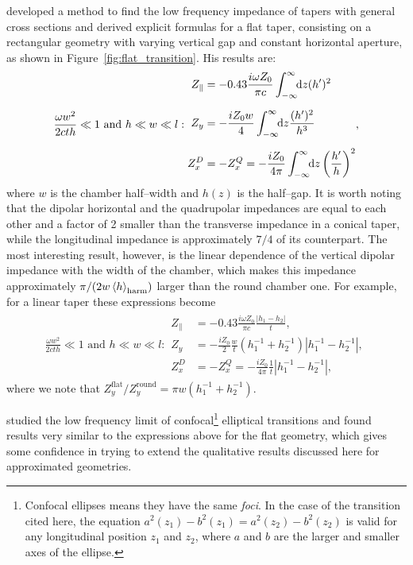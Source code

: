      developed a method to find the low frequency impedance of tapers with general cross sections and derived explicit formulas for a flat taper, consisting on a rectangular geometry with varying vertical gap and constant horizontal aperture, as shown in Figure~\ref{fig:flat_transition}. His results are:
    \begin{subequations}\label{eq:flat_transitions}
        \begin{align}
            \frac{\omega w^2}{2cth}\ll1\,\,\text{and}\,\,h\ll w\ll l:
            \begin{aligned}
                Z_\parallel &= -0.43\frac{i \omega Z_0}{\pi c}\infint{z}{(h')^2}\\[2mm]
                Z_y &= -\frac{i Z_0w}{4}\infint{z}{\frac{(h')^2}{h^3}}\\[2mm]
                Z_x^D&= -Z_x^Q= -\frac{i Z_0}{4\pi}\infint{z}{\fof{\frac{h'}{h}}^2}
            \end{aligned},
        \end{align}
    \end{subequations}
    where $w$ is the chamber half--width and $h(z)$ is the half--gap. It is worth noting that the dipolar horizontal and the quadrupolar impedances are equal to each other and a factor of 2 smaller than the transverse impedance in a conical taper, while the longitudinal impedance is approximately $7/4$ of its counterpart. The most interesting result, however, is the linear dependence of the vertical dipolar impedance with the width of the chamber, which makes this impedance approximately $\pi/(2w\average[\text{harm}]{h})$ larger than the round chamber one. For example, for a linear taper these expressions become
    \begin{align}
        \frac{\omega w^2}{2cth}\ll1\,\,\text{and}\,\,h\ll w\ll l:
        \begin{aligned}
        Z_\parallel &= -0.43\frac{i \omega Z_0}{\pi c}\frac{|h_1-h_2|}{t},\\[2mm]
        Z_y &= -\frac{i Z_0}{2}\frac{w}{t}(h_1^{-1}+h_2^{-1})|h_1^{-1}-h_2^{-1}|,\\[2mm]
        Z_x^D&= -Z_x^Q= -\frac{i Z_0}{4\pi}\frac1t|h_1^{-1}-h_2^{-1}|,
        \end{aligned}
    \end{align}
    where we note that $Z_y^\text{flat}/Z_y^\text{round} = \pi w(h_1^{-1}+h_2^{-1})$.

     studied the low frequency limit of confocal\footnote{Confocal ellipses means they have the same \emph{foci}. In the case of the transition cited here, the equation $a^2(z_1)-b^2(z_1)=a^2(z_2)-b^2(z_2)$ is valid for any longitudinal position $z_1$ and $z_2$, where $a$ and $b$ are the larger and smaller axes of the ellipse.} elliptical transitions and found results very similar to the expressions above for the flat geometry, which gives some confidence in trying to extend the qualitative results discussed here for approximated geometries.

